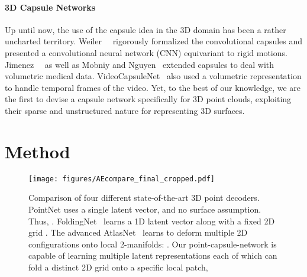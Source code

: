 \documentclass[10pt,twocolumn,letterpaper]{article}
\theoremstyle{break}
\begin{document}
\vspace{-1.5mm}\paragraph{3D Capsule Networks} Up until now, the use of the capsule idea in the 3D domain has been a rather uncharted territory. Weiler~\etal~\cite{weiler20183d} rigorously formalized the convolutional capsules and presented a convolutional neural network (CNN) equivariant to rigid motions. Jimenez~\etal~\cite{jimenez2018capsule} as well as Mobniy and Nguyen~\cite{mobiny2018fast} extended capsules to deal with volumetric medical data. VideoCapsuleNet~\cite{duarte2018videocapsulenet} also used a volumetric representation to handle temporal frames of the video. Yet, to the best of our knowledge, we are the first to devise a capsule network specifically for 3D point clouds, exploiting their sparse and unstructured nature for representing 3D surfaces. \section{Method}
\label{sec:method}
\begin{figure*}[!th]
   \centering
    \texttt{[image: figures/AEcompare\_final\_cropped.pdf]}
    \caption{Comparison of four different state-of-the-art 3D point decoders. PointNet uses a single latent vector, and no surface assumption. Thus, . FoldingNet~\cite{Yang_2018_CVPR} learns a 1D latent vector along with a fixed 2D grid . The advanced AtlasNet~\cite{groueix2018} learns to deform multiple 2D configurations onto local 2-manifolds: . Our point-capsule-network is capable of learning multiple latent representations each of which can fold a distinct 2D grid onto a specific local patch, }
    \label{fig:aecompare}
\end{figure*}
\end{document}
